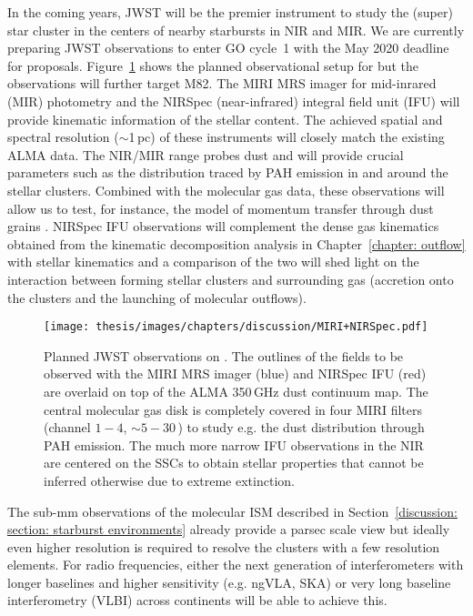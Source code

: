 In the coming years, JWST will be the premier instrument to study the (super) star cluster in the centers of nearby starbursts in NIR and MIR. 
We are currently preparing JWST observations to enter GO cycle~1 with the May 2020 deadline for proposals. 
Figure~\ref{discussion: figure: JWST planing} shows the planned observational setup for  but the observations will further target M82.  The MIRI MRS imager for mid-inrared (MIR) photometry and the NIRSpec (near-infrared) integral field unit (IFU) will provide kinematic information of the stellar content.
The achieved spatial and spectral resolution ($\sim$1\,pc) of these instruments will closely match the existing ALMA data. The NIR/MIR range probes dust and will provide crucial parameters such as the distribution traced by PAH emission in and around the stellar clusters. 
Combined with the molecular gas data, these observations will allow us to test, for instance, the model of momentum transfer through dust grains \citep[e.g.][]{2018ApJ...854..110Z}.
NIRSpec IFU observations will complement the dense gas kinematics obtained from the kinematic decomposition analysis in Chapter~\ref{chapter: outflow} with stellar kinematics and a comparison of the two will shed light on the interaction between forming stellar clusters and surrounding gas (accretion onto the clusters and the launching of molecular outflows).

\begin{figure}
    \centering
    \texttt{[image: thesis/images/chapters/discussion/MIRI+NIRSpec.pdf]}
    \caption[Planned JWST MIRI and NIRSpec setup]{Planned JWST observations on . The outlines of the fields to be observed with the MIRI MRS imager (blue) and NIRSpec IFU (red) are overlaid on top of the ALMA 350\,GHz dust continuum map. The central molecular gas disk is completely covered in four MIRI filters (channel $1-4$, $\sim 5-30$\,\mum) to study e.g. the dust distribution through PAH emission. The much more narrow IFU observations in the NIR are centered on the SSCs to obtain stellar properties that cannot be inferred otherwise due to extreme extinction.
    }
    \label{discussion: figure: JWST planing}
\end{figure}

The sub-mm observations of the molecular ISM described in Section~\ref{discussion: section: starburst environments} already provide a parsec scale view but ideally even higher resolution is required to resolve the clusters with a few resolution elements. For radio frequencies, either the next generation of interferometers with longer baselines and higher sensitivity (e.g. ngVLA, SKA) or very long baseline interferometry (VLBI) across continents will be able to achieve this.


